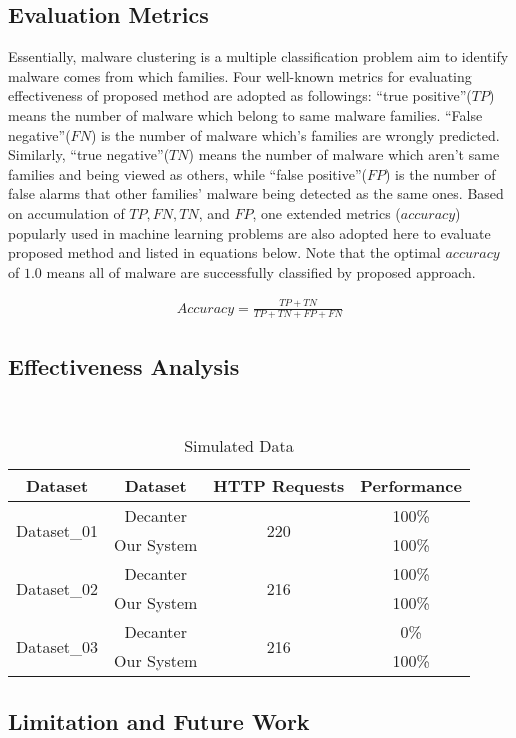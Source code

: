 \subsection{Evaluation Metrics}

{\color{red}{Tony, pliz replace malware to fingerprint!!!}}

Essentially, malware clustering is a multiple classification problem aim to identify malware comes from which families. Four well-known metrics for evaluating effectiveness of proposed method are adopted as followings: ``true positive''($TP$) means the number of malware which belong to same malware families. ``False negative''($FN$) is the number of malware which's families are wrongly predicted. Similarly, ``true negative''($TN$) means the number of malware which aren't same families and being viewed as others, while ``false positive''($FP$) is the number of false alarms that other families' malware being detected as the same ones. Based on accumulation of $TP, FN, TN$, and $FP$, one extended metrics ($accuracy$) popularly used in machine learning problems are also adopted here to evaluate proposed method and listed in equations below. Note that the optimal $accuracy$ of $1.0$ means all of malware are successfully classified by proposed approach. 

\begin{eqnarray}
\label{eq:accuracy}
Accuracy = \frac{TP+TN}{TP+TN+FP+FN}
\end{eqnarray}

\subsection{Effectiveness Analysis}

{\color{red}{Tony, pliz show your exp graph and table here!!!}}\\

\begin{table}[]
\centering
\caption{Simulated Data}
\label{tbl:db_01}
\begin{tabular}{|c|c|c|c|}
\hline\hline
Dataset                    & Dataset    & HTTP Requests        & Performance \\ \hline
\multirow{2}{*}{Dataset\_01}  & Decanter   & \multirow{2}{*}{220} & 100\%       \\ \cline{2-2} \cline{4-4} 
                           & Our System &                      & 100\%       \\ \hline
\multirow{2}{*}{Dataset\_02} & Decanter   & \multirow{2}{*}{216} & 100\%       \\ \cline{2-2} \cline{4-4} 
                           & Our System &                      & 100\%       \\ \hline
\multirow{2}{*}{Dataset\_03} & Decanter   & \multirow{2}{*}{216} & 0\%         \\ \cline{2-2} \cline{4-4} 
                           & Our System &                      & 100\%       \\ \hline\hline
\end{tabular}
\end{table}

\subsection{Limitation and Future Work}
